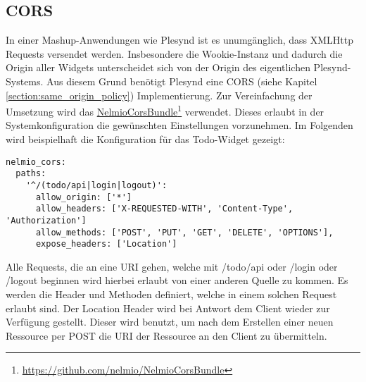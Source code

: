 \subsection{CORS}\label{section:cors_implementierung}
In einer Mashup-Anwendungen wie Plesynd ist es unumgänglich, dass XMLHttp Requests versendet werden. Insbesondere die Wookie-Instanz und dadurch die Origin aller Widgets unterscheidet sich von der Origin des eigentlichen Plesynd-Systems. Aus diesem Grund benötigt Plesynd eine CORS (siehe Kapitel \ref{section:same_origin_policy}) Implementierung. Zur Vereinfachung der Umsetzung wird das \href{https://github.com/nelmio/NelmioCorsBundle}{NelmioCorsBundle}\footnote{\url{https://github.com/nelmio/NelmioCorsBundle}} verwendet. Dieses erlaubt in der Systemkonfiguration die gewünschten Einstellungen vorzunehmen. Im Folgenden wird beispielhaft die Konfiguration für das Todo-Widget gezeigt: 
\begin{lstlisting}
nelmio_cors:
  paths:
    '^/(todo/api|login|logout)':
      allow_origin: ['*']
      allow_headers: ['X-REQUESTED-WITH', 'Content-Type', 'Authorization']
      allow_methods: ['POST', 'PUT', 'GET', 'DELETE', 'OPTIONS'],
      expose_headers: ['Location']
\end{lstlisting}
Alle Requests, die an eine URI gehen, welche mit /todo/api oder /login oder /logout beginnen wird hierbei erlaubt von einer anderen Quelle zu kommen. Es werden die Header und Methoden definiert, welche in einem solchen Request erlaubt sind. Der Location Header wird bei Antwort dem Client wieder zur Verfügung gestellt. Dieser wird benutzt, um nach dem Erstellen einer neuen Ressource per POST die URI der Ressource an den Client zu übermitteln. 

